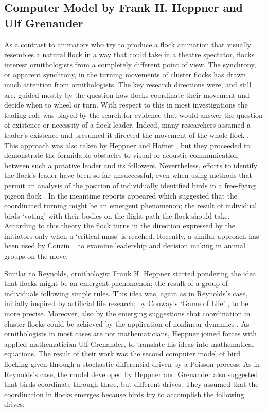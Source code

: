\subsection{Computer Model by Frank H. Heppner and Ulf Grenander}
\label{subsec:birdFlocks:fhh}
As a contrast to animators who try to produce a flock animation that visually resembles a natural flock in a way that could take in a theatre spectator, flocks interest ornithologists from a completely different point of view. The synchrony, or apparent synchrony, in the turning movements of cluster flocks has drawn much attention from ornithologists. The key research directions were, and still are, guided mostly by the question how flocks coordinate their movement and decide when to wheel or turn. With respect to this in most investigations the leading role was played by the search for evidence that would answer the question of existence or necessity of a flock leader. Indeed, many researchers assumed a leader's existence and presumed it directed the movement of the whole flock \cite{heppner:1990}. This approach was also taken by Heppner and Hafner \cite{heppner:1974b}, but they proceeded to demonstrate the formidable obstacles to visual or acoustic communication between such a putative leader and its followers. Nevertheless, efforts to identify the flock's leader have been so far unsuccessful, even when using methods that permit an analysis of the position of individually identified birds in a free-flying pigeon flock \cite{pomeroy:1992}. In the meantime reports appeared \cite{davis:1980} which suggested that the coordinated turning might be an emergent phenomenon; the result of individual birds `voting' with their bodies on the flight path the flock should take. According to this theory the flock turns in the direction expressed by the initiators only when a `critical mass' is reached. Recently, a similar approach has been used by Couzin \etal\ \cite{couzin:2005} to examine leadership and decision making in animal groups on the move.

Similar to Reynolds, ornithologist Frank H. Heppner started pondering the idea that flocks might be an emergent phenomenon; the result of a group of individuals following simple rules. This idea was, again as in Reynolds's case, initially inspired by artificial life research; by Conway's `Game of Life' \cite{gardner:1970}, to be more precise. Moreover, also by the emerging suggestions that coordination in cluster flocks could be achieved by the application of nonlinear dynamics \cite{okubo:1986}. As ornithologists in most cases are not mathematicians, Heppner joined forces with applied mathematician Ulf Grenander, to translate his ideas into mathematical equations. The result of their work was the second computer model of bird flocking \cite{heppner:1990} given through a stochastic differential driven by a Poisson process. As in Reynolds's case, the model developed by Heppner and Grenander also suggested that birds coordinate through three, but different drives. They assumed that the coordination in flocks emerges because birds try to accomplish the following drives:

